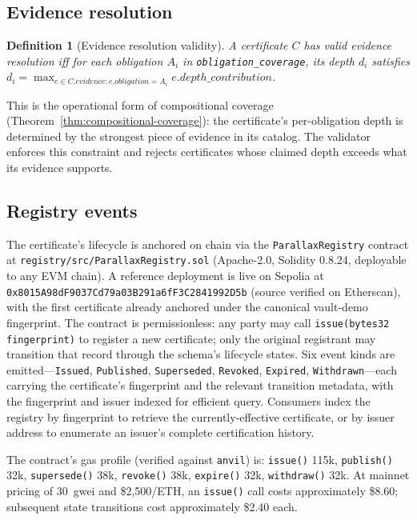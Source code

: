 \documentclass[11pt,a4paper]{article}
\newtheorem{definition}[theorem]{Definition}
\begin{document}
\subsection{Evidence resolution}

\begin{definition}[Evidence resolution validity]\label{def:evidence-resolution}
A certificate $C$ has \emph{valid evidence resolution} iff for each obligation $A_i$ in \texttt{obligation\_coverage}, its depth $d_i$ satisfies $d_i = \max_{e \in C.\mathit{evidence} : e.\mathit{obligation} = A_i} e.\mathit{depth\_contribution}$.
\end{definition}

This is the operational form of compositional coverage (Theorem~\ref{thm:compositional-coverage}): the certificate's per-obligation depth is determined by the strongest piece of evidence in its catalog. The validator enforces this constraint and rejects certificates whose claimed depth exceeds what its evidence supports.

\subsection{Registry events}\label{sec:registry}

The certificate's lifecycle is anchored on chain via the \texttt{ParallaxRegistry} contract at \texttt{registry/src/ParallaxRegistry.sol} (Apache-2.0, Solidity 0.8.24, deployable to any EVM chain). A reference deployment is live on Sepolia at \texttt{0x8015A98dF9037Cd79a03B291a6fF3C2841992D5b} (source verified on Etherscan), with the first certificate already anchored under the canonical vault-demo fingerprint. The contract is permissionless: any party may call \texttt{issue(bytes32 fingerprint)} to register a new certificate; only the original registrant may transition that record through the schema's lifecycle states. Six event kinds are emitted---\texttt{Issued}, \texttt{Published}, \texttt{Superseded}, \texttt{Revoked}, \texttt{Expired}, \texttt{Withdrawn}---each carrying the certificate's fingerprint and the relevant transition metadata, with the fingerprint and issuer indexed for efficient query. Consumers index the registry by fingerprint to retrieve the currently-effective certificate, or by issuer address to enumerate an issuer's complete certification history.

The contract's gas profile (verified against \texttt{anvil}) is: \texttt{issue()} 115k, \texttt{publish()} 32k, \texttt{supersede()} 38k, \texttt{revoke()} 38k, \texttt{expire()} 32k, \texttt{withdraw()} 32k. At mainnet pricing of 30~gwei and \$2{,}500/ETH, an \texttt{issue()} call costs approximately \$8.60; subsequent state transitions cost approximately \$2.40 each.
\end{document}
